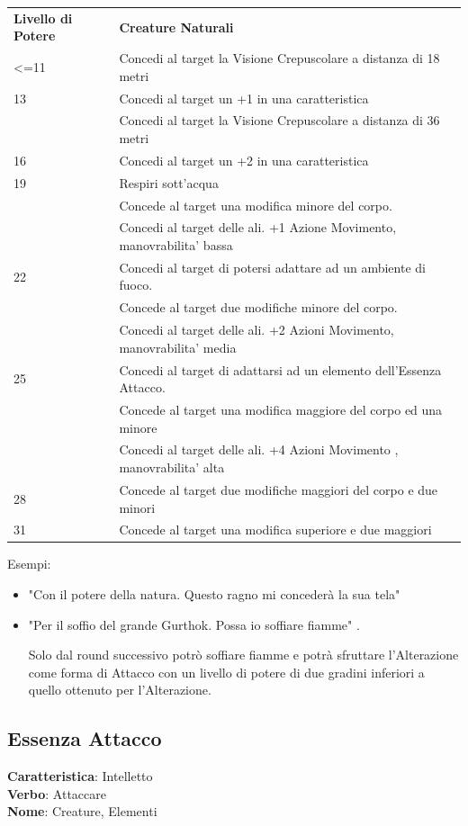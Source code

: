 \documentclass[a4paper,11pt,twoside,openany]{book}
\begin{document}
\begin{tabularx}{\textwidth}{lX}
	\toprule
	\textbf{Livello di Potere} & \textbf{Creature Naturali}\tabularnewline
	<=11   & Concedi al target la Visione Crepuscolare a distanza di 18 metri\\
	13     & Concedi al target un +1 in una caratteristica\tabularnewline
	       & Concedi al target la Visione Crepuscolare a distanza di 36 metri\tabularnewline
	16     & Concedi al target un +2 in una caratteristica\tabularnewline
	19     & Respiri sott'acqua\tabularnewline
	       & Concede al target una modifica minore del corpo.\tabularnewline
	       & Concedi al target delle ali. +1 Azione Movimento, manovrabilita’ bassa\tabularnewline
	22     & Concedi al target di potersi adattare ad un ambiente di fuoco.\tabularnewline
	       & Concede al target due modifiche minore del corpo.\tabularnewline
	       & Concedi al target delle ali. +2 Azioni Movimento, manovrabilita’ media\tabularnewline
	25     & Concedi al target di adattarsi ad un elemento dell’Essenza Attacco. \tabularnewline
	       & Concede al target una modifica maggiore del corpo ed una minore\tabularnewline
	       & Concedi al target delle ali. +4 Azioni Movimento , manovrabilita’ alta\tabularnewline
	28     & Concede al target due modifiche maggiori del corpo e due minori\tabularnewline
	31     & Concede al target una modifica superiore e due maggiori\tabularnewline
\end{tabularx}

\bigskip

Esempi:
\begin{itemize}
	\item
	      "Con il potere della natura. Questo ragno mi concederà la sua tela"
	\item
	      "Per il soffio del grande Gurthok. Possa io soffiare fiamme" .

	      Solo dal round successivo potrò soffiare fiamme e potrà sfruttare l'Alterazione come forma di Attacco con un livello di potere di due gradini inferiori a quello ottenuto per l'Alterazione.
\end{itemize}

\pagebreak

\subsection{Essenza Attacco}

\textbf{Caratteristica}: Intelletto\\
\textbf{Verbo}: Attaccare\\
\textbf{Nome}: Creature, Elementi\\
\end{document}
